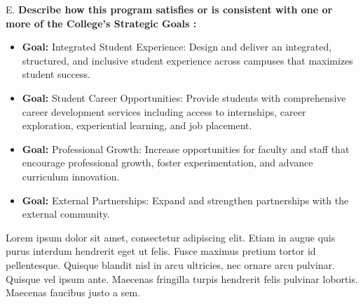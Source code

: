 E. \textbf{Describe how this program satisfies or is consistent with one or more of the College’s Strategic Goals \footnotemark :}
\begin{itemize}
    \item \textbf{Goal:} Integrated Student Experience: Design and deliver an integrated, structured, and inclusive student experience across campuses that maximizes student success.
    \item \textbf{Goal:} Student Career Opportunities: Provide students with comprehensive career development services including access to internships, career exploration, experiential learning, and job placement.
    \item \textbf{Goal:} Professional Growth: Increase opportunities for faculty and staff that encourage professional growth, foster experimentation, and advance curriculum innovation.
    \item \textbf{Goal:} External Partnerships: Expand and strengthen partnerships with the external community.
\end{itemize}




Lorem ipsum dolor sit amet, consectetur adipiscing elit. Etiam in augue quis purus interdum hendrerit eget ut felis. Fusce maximus pretium tortor id pellentesque. Quisque blandit nisl in arcu ultricies, nec ornare arcu pulvinar. Quisque vel ipsum ante. Maecenas fringilla turpis hendrerit felis pulvinar lobortis. Maecenas faucibus justo a sem. 
